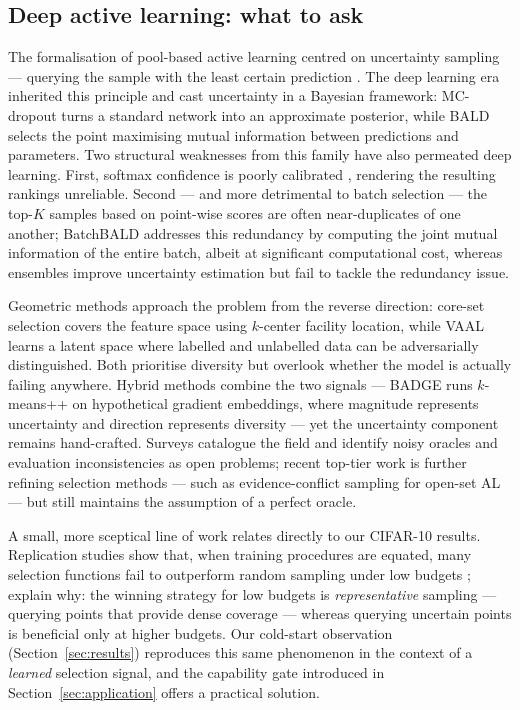 \documentclass[a4paper,fleqn,longmktitle]{cas-sc}
\begin{document}
\subsection{Deep active learning: what to ask}
The formalisation of pool-based active learning centred on uncertainty
sampling --- querying the sample with the least certain prediction
\citep{lewis1994,settles2009}. The deep learning era inherited this
principle and cast uncertainty in a Bayesian framework: MC-dropout
\citep{gal2016} turns a standard network into an approximate posterior,
while BALD \citep{houlsby2011,gal2017} selects the point maximising
mutual information between predictions and parameters. Two structural
weaknesses from this family have also permeated deep learning. First,
softmax confidence is poorly calibrated \citep{guo2017}, rendering the
resulting rankings unreliable. Second --- and more detrimental to batch
selection --- the top-$K$ samples based on point-wise scores are often
near-duplicates of one another; BatchBALD \citep{kirsch2019} addresses
this redundancy by computing the joint mutual information of the entire
batch, albeit at significant computational cost, whereas ensembles
\citep{beluch2018} improve uncertainty estimation but fail to tackle
the redundancy issue.

Geometric methods approach the problem from the reverse direction:
core-set selection \citep{sener2018} covers the feature space using
$k$-center facility location, while VAAL \citep{sinha2019} learns a
latent space where labelled and unlabelled data can be adversarially
distinguished. Both prioritise diversity but overlook whether the model
is actually failing anywhere. Hybrid methods combine the two signals
--- BADGE \citep{ash2020} runs $k$-means++ on hypothetical gradient
embeddings, where magnitude represents uncertainty and direction
represents diversity --- yet the uncertainty component remains
hand-crafted. Surveys \citep{ren2021,wu2022} catalogue the field and
identify noisy oracles and evaluation inconsistencies as open problems;
recent top-tier work is further refining selection methods --- such as
evidence-conflict sampling for open-set AL \citep{ning2026} --- but
still maintains the assumption of a perfect oracle.

A small, more sceptical line of work relates directly to our CIFAR-10
results. Replication studies show that, when training procedures are
equated, many selection functions fail to outperform random sampling
under low budgets \citep{mittal2019,munjal2022}; \citet{hacohen2022}
explain why: the winning strategy for low budgets is
\emph{representative} sampling --- querying points that provide dense
coverage --- whereas querying uncertain points is beneficial only at
higher budgets. Our cold-start observation
(Section~\ref{sec:results}) reproduces this same phenomenon in the
context of a \emph{learned} selection signal, and the capability gate
introduced in Section~\ref{sec:application} offers a practical
solution.
\end{document}
